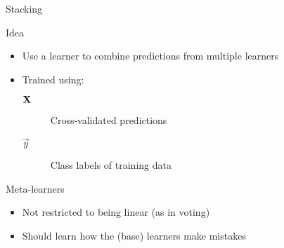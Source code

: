 \begin{frame}{Stacking}
    \begin{block}{Idea}
        \begin{itemize}
            \item Use a learner to combine predictions from multiple learners
            \item Trained using:
                  \begin{description}
                      \item[$\mathbf{X}$] Cross\hyp{}validated predictions
                      \item[$\vec{y}$] Class labels of training data
                  \end{description}
        \end{itemize}
    \end{block}
    \vfill
    \begin{block}{Meta\hyp{}learners}
        \begin{itemize}
            \item Not restricted to being linear (as in voting)
            \item Should learn how the (base) learners make mistakes
        \end{itemize}
    \end{block}
\end{frame}



